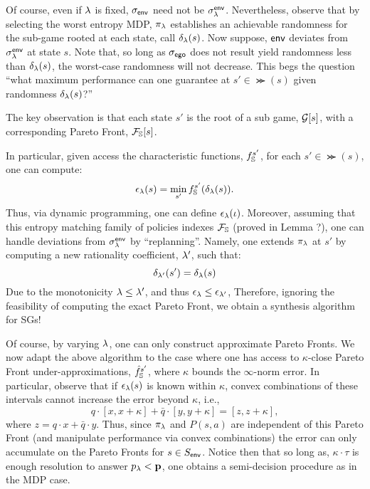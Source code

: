 Of course, even if $\lambda$ is fixed, ${\sigma_{\mathsf{env}}}$ need not be
$\sigma^{\mathsf{env}}_\lambda$. Nevertheless, observe that by selecting the worst
entropy MDP, $\pi_\lambda$ establishes an achievable randomness for the
sub-game rooted at each state, call $\delta_\lambda(s)$. Now suppose,
$\mathsf{env}$ deviates from $\sigma_\lambda^{\mathsf{env}}$ at state $s$. Note that, so
long as ${\sigma_{\mathsf{ego}}}$ does not result yield randomness less than
$\delta_\lambda(s)$, the worst-case randomness will not decrease.
This begs the question ``what maximum performance can one guarantee at $s' \in
\Succ(s)$ given randomness $\delta_\lambda(s)$?''
\begin{mdframed}
  The key observation is that each state $s'$ is the root of a sub
  game, $\mathcal{G}[s]$, with a corresponding Pareto Front,
  $\mathcal{F}_{\mathbb{S}}[s]$.
\end{mdframed}
In particular, given access the characteristic functions,
$f_{\mathbb{S}}^{s'}$, for each $s' \in \Succ(s)$, one can compute:
\begin{equation}\label{eq:performance_lookup}
  \epsilon_\rat(s) = \min_{s'} f_\solutions^{s'}(\delta_\rat(s)).
\end{equation}
Thus, via dynamic programming, one can define $\epsilon_\lambda(\iota)$.
Moreover, assuming that this entropy matching family of policies
indexes $\mathcal{F}_{\mathbb{S}}$ (proved in Lemma ?), one can handle
deviations from $\sigma^{\mathsf{env}}_\lambda$ by ``replanning''. Namely, one
extends $\pi_\lambda$ at $s'$ by computing a new rationality coefficient,
$\lambda'$, such that:
\begin{equation}
  \delta_{\lambda'}(s') = \delta_{\lambda}(s)
\end{equation}
Due to the monotonicity $\lambda \leq \lambda'$, and thus $\epsilon_\lambda \leq \epsilon_{\lambda'}$, 
Therefore, ignoring the feasibility of computing the exact Pareto
Front, we obtain a synthesis algorithm for SGs!

Of course, by varying $\lambda$, one can only construct approximate
Pareto Fronts. We now
adapt the above algorithm to the case where one has access to
$\kappa$-close Pareto Front under-approximations,
$\hat{f}_{\mathbb{S}}^{s'}$, where $\kappa$ bounds the $\infty$-norm
error. In particular, observe that if $\epsilon_\lambda(s)$ is known
within $\kappa$, convex combinations of these intervals cannot
increase the error beyond $\kappa$, i.e.,
\begin{equation}
  q\cdot[x, x + \kappa] + \bar{q}\cdot[y, y + \kappa] = [z, z + \kappa],
\end{equation}
where $z = q\cdot x + \bar{q}\cdot y$. Thus, since $\pi_\lambda$ and
$P(s, a)$ are independent of this Pareto Front (and manipulate
performance via convex combinations) the error can only accumulate on
the Pareto Fronts for $s \in S_{\mathsf{env}}$. Notice then that so long as,
$\kappa\cdot\tau$ is enough resolution to answer $p_\lambda <
\mathbf{p}$, one obtains a semi-decision procedure as in the MDP
case.


